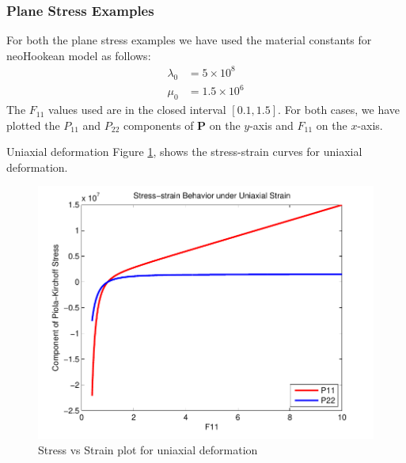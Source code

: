 \message{ !name(p1_2.tex)}\documentclass[../main.tex]{subfiles}
\begin{document}
\subsubsection{Plane Stress Examples}

For both the plane stress examples we have used the material constants
for neoHookean model as follows:
\begin{align*}
  \lambda_0 &= 5\times10^8\\
  \mu_0 & = 1.5\times10^6
\end{align*}
The $F_{11}$ values used are in the closed interval $[0.1,1.5]$. For
both cases, we have plotted the $P_{11}$ and $P_{22}$ components of
$\mathbf{P}$ on the $y$-axis and $F_{11}$ on the $x$-axis.

\item {Uniaxial deformation}
Figure \ref{fig:uniaxial}, shows the stress-strain curves for uniaxial
deformation.
\begin{figure}[h]
  \centering
  \includegraphics{./img/Uniaxial_1.pdf}
  \caption{Stress vs Strain plot for uniaxial deformation}
  \label{fig:uniaxial}
\end{figure}
\end{document}
